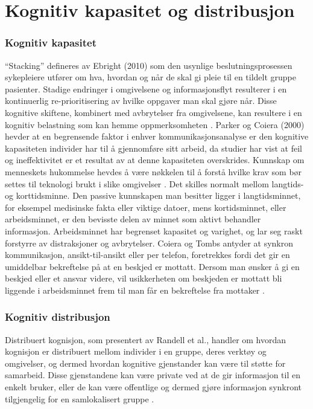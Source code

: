 \section{Kognitiv kapasitet og distribusjon}
\label{chp: kognisjon}

\subsubsection{Kognitiv kapasitet}
“Stacking” defineres av Ebright (2010) som den usynlige beslutningsprosessen sykepleiere utfører om hva, hvordan og når de skal gi pleie til en tildelt gruppe pasienter. Stadige endringer i omgivelsene og informasjonsflyt resulterer i en kontinuerlig re-prioritisering av hvilke oppgaver man skal gjøre når. Disse kognitive skiftene, kombinert med avbrytelser fra omgivelsene, kan resultere i en kognitiv belastning som kan hemme oppmerksomheten \cite{Ebright10}. Parker og Coiera (2000) hevder at en begrensende faktor i enhver kommunikasjonsanalyse er den kognitive kapasiteten individer har til å gjennomføre sitt arbeid, da studier har vist at feil og ineffektivitet er et resultat av at denne kapasiteten overskrides. Kunnskap om menneskets hukommelse hevdes å være nøkkelen til å forstå hvilke krav som bør settes til teknologi brukt i slike omgivelser \cite{Parker00}. Det skilles normalt mellom langtids- og korttidsminne. Den passive kunnskapen man besitter ligger i langtidsminnet, for eksempel medisinske fakta eller viktige datoer, mens kortidsminnet, eller arbeidsminnet, er den bevisste delen av minnet som aktivt behandler informasjon. Arbeidsminnet har begrenset kapasitet og varighet, og lar seg raskt forstyrre av distraksjoner og avbrytelser. Coiera og Tombs antyder at synkron kommunikasjon, ansikt-til-ansikt eller per telefon, foretrekkes fordi det gir en umiddelbar bekreftelse på at en beskjed er mottatt. Dersom man ønsker å gi en beskjed eller et ansvar videre, vil usikkerheten om beskjeden er mottatt bli liggende i arbeidsminnet frem til man får en bekreftelse fra mottaker \cite{Parker00}. 

\subsubsection{Kognitiv distribusjon}
Distribuert kognisjon, som presentert av Randell et al., handler om hvordan kognisjon er distribuert mellom individer i en gruppe, deres verktøy og omgivelser, og dermed hvordan kognitive gjenstander kan være til støtte for samarbeid. Disse gjenstandene kan være private ved at de gir informasjon til en enkelt bruker, eller de kan være offentlige og dermed gjøre informasjon synkront tilgjengelig for en samlokalisert gruppe \cite{Randell}.  